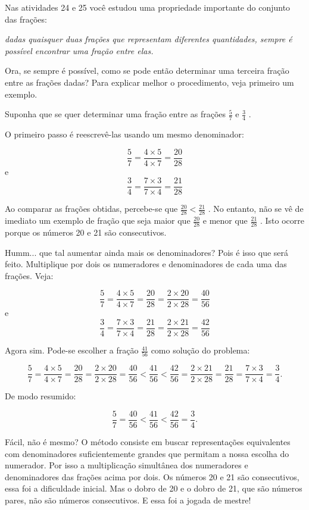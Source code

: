 \documentclass[a4,12pt]{book}
\begin{document}
\begin{refletindo*}[breakable]{}{}  
  
  Nas atividades 24 e 25 você estudou uma propriedade importante do conjunto das frações:  
  
{\it  dadas quaisquer duas frações que representam diferentes quantidades, sempre é possível encontrar uma  fração entre elas.}   
  

  Ora, se sempre é possível, como se pode então determinar uma terceira fração entre as frações dadas? Para explicar melhor o procedimento, veja primeiro um exemplo.  
  
  Suponha que se quer determinar uma fração entre as frações   $\frac{5}{7}$   e   $\frac{3}{4}$  .  
  
  O primeiro passo é reescrevê-las usando um mesmo denominador:  
  
  $$\dfrac{5}{7} = \dfrac{4 \times 5}{ 4 \times 7} = \dfrac{20}{28}$$  
  e  
  $$\dfrac{3}{4} = \dfrac{7 \times 3}{ 7 \times 4} = \dfrac{21}{28}$$  
  
  Ao comparar as frações obtidas, percebe-se que   $\frac{20}{28}<\frac{21}{28}$  . No entanto, não se vê de imediato um exemplo de fração que seja maior que   $\frac{20}{28}$   e menor que   $\frac{21}{28}$  . Isto ocorre porque os números 20 e 21 são consecutivos.  
  
  Humm... que tal aumentar ainda mais os denominadores? Pois é isso que será feito.  Multiplique por dois os numeradores e denominadores de cada uma das frações. Veja:  
  
  $$\dfrac{5}{7} = \dfrac{4 \times 5}{ 4 \times 7} = \dfrac{20}{28} = \dfrac{2 \times 20}{ 2 \times 28} = \dfrac{40}{56}$$  
  e  
  $$\dfrac{3}{4} = \dfrac{7 \times 3}{ 7 \times 4} = \dfrac{21}{28} = \dfrac{2 \times 21}{2 \times 28} = \dfrac{42}{56}$$  
  
  Agora sim. Pode-se escolher a fração   $\frac{41}{56}$   como solução do problema:  
  
  $$\dfrac{5}{7} = \dfrac{4 \times 5}{ 4 \times 7} = \dfrac{20}{28} = \dfrac{2 \times 20}{ 2 \times 28} = \dfrac{40}{56} < \dfrac{41}{56} < \dfrac{42}{56} = \dfrac{2 \times 21}{2 \times 28} =  \dfrac{21}{28} = \dfrac{7 \times 3}{ 7 \times 4} = \dfrac{3}{4}.$$  
  
  De modo resumido:  
  
  $$\dfrac{5}{7} = \dfrac{40}{56} < \dfrac{41}{56} < \dfrac{42}{56} =\dfrac{3}{4}.$$  
  
  Fácil, não é mesmo? O método consiste em buscar representações equivalentes com denominadores suficientemente grandes que permitam a nossa escolha do numerador. Por isso a multiplicação simultânea dos numeradores e denominadores das frações acima por dois. Os números 20 e 21 são consecutivos, essa foi a dificuldade inicial. Mas o dobro de 20 e o dobro de 21, que são números pares, não são números consecutivos. E essa foi a jogada de mestre!  
  

\end{refletindo*}
\end{document}
